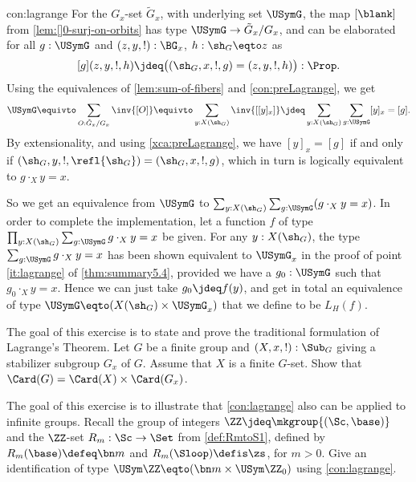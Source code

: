 \begin{implementation}{con:lagrange}
For the $G_x$-set ${\tilde G_x}$, with underlying set $\USymG$, 
the map $[\blank]$ from \cref{lem:[]0-surj-on-orbits} has type 
$\USymG \to {\tilde G_x}/G_x$, and
can be elaborated for all $g:\USymG$ and 
$(z,y,!):\BG_x$, $h:\sh_G\eqto z$ as
\[
[g](z,y,!,h) \jdeq \bigl((\sh_G,x,!,g)=(z,y,!,h)\bigr) : \Prop.
\]
Using the equivalences of \cref{lem:sum-of-fibers} and 
\cref{con:preLagrange}, we get
\[
\USymG
\equivto \sum_{O:{\tilde G_x}/G_x} \inv{[O]}
\equivto \sum_{y:X(\sh_G)} \inv{[[y]_x]} 
\jdeq \sum_{y:X(\sh_G)}\sum_{g:\USymG} [y]_x = [g] .
\]
By extensionality, and using \cref{xca:preLagrange}, 
we have $[y]_x = [g]$ if and only if 
$(\sh_G,y,!,\refl{\sh_G})=(\sh_G,x,!,g)$, which in turn 
is logically equivalent to $g\cdot_X y = x$.

So we get an equivalence from $\USymG$ to 
$\sum_{y:X(\sh_G)}\sum_{g:\USymG} (g\cdot_X y = x)$.
In order to complete the implementation, let a function $f$ of 
type $\prod_{y:X(\sh_G)}\sum_{g:\USymG} g\cdot_X y = x$ be given. 
For any $y:X(\sh_G)$, the type $\sum_{g:\USymG} g\cdot_X y = x$ has been
shown equivalent to $\USymG_x$ in the proof of point \ref{it:lagrange} of \cref{thm:summary5.4},
provided we have a $g_0:\USymG$ such that $g_0\cdot_X y = x$.
Hence we can just take $g_0 \jdeq f(y)$, and get in total an equivalence of 
type $\USymG \eqto (X(\sh_G) \times \USymG_x)$ that we define to be $L_H(f)$.
\end{implementation}

\begin{xca}\label{xca:lagrange}
The goal of this exercise is to state and prove the traditional
formulation of  Lagrange's Theorem. 
Let $G$ be a finite group and $(X,x,!):\Sub_G$ giving a 
stabilizer subgroup $G_x$ of $G$.
Assume that $X$ is a finite $G$-set.
Show that $\Card(G) = \Card(X) \times \Card(G_x)$.
\end{xca}

\begin{xca}\label{xca:lagrange-Z-action-Rm}
The goal of this exercise is to illustrate that \cref{con:lagrange}
also can be applied to infinite groups. 
Recall the group of integers $\ZZ\jdeq\mkgroup{(\Sc,\base)}$ and the $\ZZ$-set
$R_m: \Sc\to\Set$ from \cref{def:RmtoS1}, defined by $R_m(\base) \defeq \bn m$
and $R_m(\Sloop) \defis \zs$, for $m>0$. Give an identification of type
$\USym\ZZ \eqto (\bn m \times \USym\ZZ_0)$ using \cref{con:lagrange}.
\end{xca}

